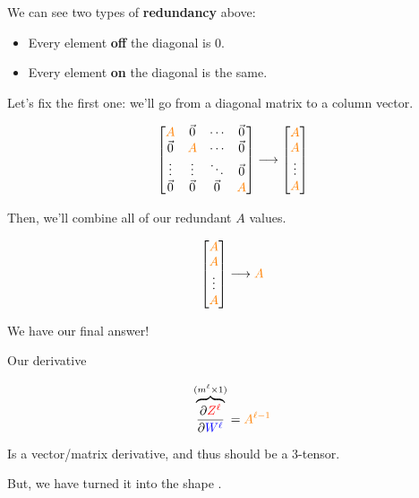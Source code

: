         We can see two types of \textbf{redundancy} above:
        
        \begin{itemize}
            \item Every element \textbf{off} the diagonal is 0.
            \item Every element \textbf{on} the diagonal is the same.
        \end{itemize}
        
        Let's fix the first one: we'll go from a diagonal matrix to a column vector.
        
        \begin{equation}
            \begin{bmatrix}
                \textcolor{orange}{A} & \vec{0} & \cdots  & \vec{0} \\
                \vec{0} & \textcolor{orange}{A} & \cdots  & \vec{0} \\
                \vdots  & \vdots  & \ddots  & \vec{0} \\
                \vec{0} & \vec{0} & \vec{0} & \textcolor{orange}{A}
            \end{bmatrix}
            \longrightarrow
            \begin{bmatrix}
                \textcolor{orange}{A} \\ \textcolor{orange}{A} \\ \vdots \\ \textcolor{orange}{A} 
            \end{bmatrix}
        \end{equation}
        
        Then, we'll combine all of our redundant $A$ values.
        
        \begin{equation}
            \begin{bmatrix}
                \textcolor{orange}{A} \\ \textcolor{orange}{A} \\ \vdots \\ \textcolor{orange}{A} 
            \end{bmatrix}
            \longrightarrow
            \textcolor{orange}{A}
        \end{equation}
        
        We have our final answer!\\
        
        \begin{notation}
            Our derivative
            
            \begin{equation*}
                \overbrace{
                    \frac{\partial \textcolor{red}{Z^\ell}}{\partial  \textcolor{blue}{W^{\ell}} } 
                }^{ (m^{\ell} \times 1) }
                = 
                \textcolor{orange}{A^{\ell-1}}
            \end{equation*}
        
            Is a vector/matrix derivative, and thus should be a 3-tensor.
            
            But, we have turned it into the shape .
        \end{notation}
        
